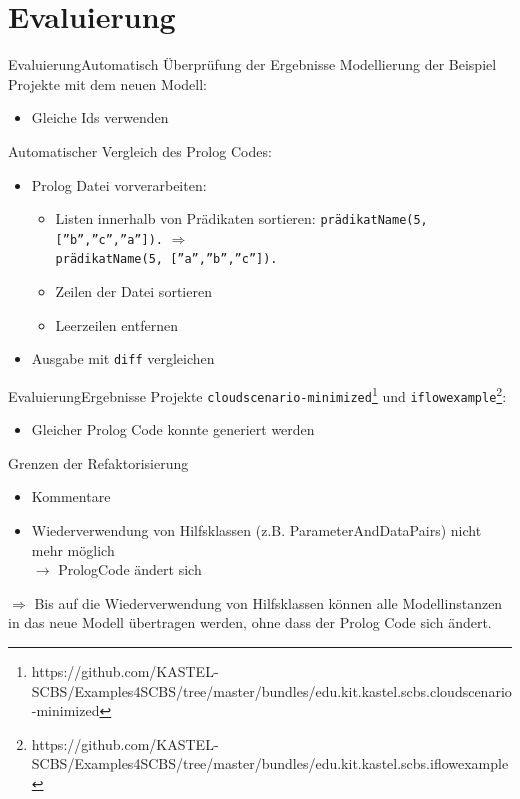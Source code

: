 \documentclass{sdqbeamer}
\begin{document}
\section{Evaluierung}
\begin{frame}{Evaluierung}{Automatisch Überprüfung der Ergebnisse}
	Modellierung der Beispiel Projekte mit dem neuen Modell:
	\begin{itemize}
		\item Gleiche Ids verwenden
	\end{itemize}
\vspace{0.05\textheight}
	Automatischer Vergleich des Prolog Codes:
	\begin{itemize}
		\item Prolog Datei vorverarbeiten:
		\begin{itemize}
			\item Listen innerhalb von Prädikaten sortieren:
			\hspace{0.05\textwidth}\texttt{prädikatName(5, [''b'',''c'',''a'']).} $\Rightarrow$ \\ \hspace{0.408\textwidth} \texttt{prädikatName(5, [''a'',''b'',''c'']).}
			\item Zeilen der Datei sortieren
			\item Leerzeilen entfernen
		\end{itemize}
		\item Ausgabe mit \texttt{diff} vergleichen
	\end{itemize}
\end{frame}
\begin{frame}{Evaluierung}{Ergebnisse}
		Projekte \texttt{cloudscenario-minimized}\footnote{https://github.com/KASTEL-SCBS/Examples4SCBS/tree/master/bundles/edu.kit.kastel.scbs.cloudscenario-minimized} und \texttt{iflowexample}\footnote{https://github.com/KASTEL-SCBS/Examples4SCBS/tree/master/bundles/edu.kit.kastel.scbs.iflowexample}:
		\begin{itemize}
			\item Gleicher Prolog Code konnte generiert werden
		\end{itemize}
		\vspace{0.05\textheight}
		Grenzen der Refaktorisierung
		\begin{itemize}
			\item Kommentare
			\item Wiederverwendung von Hilfsklassen (z.B. ParameterAndDataPairs) nicht mehr möglich\\ $\rightarrow$ PrologCode ändert sich
		\end{itemize}
	$\Rightarrow$ Bis auf die Wiederverwendung von Hilfsklassen können alle Modellinstanzen in das neue Modell übertragen werden, ohne dass der Prolog Code sich ändert.
\end{frame}
\end{document}
